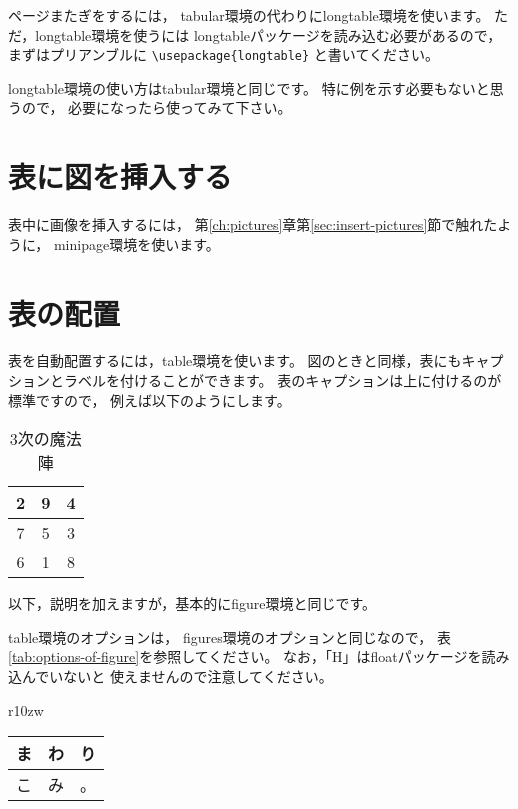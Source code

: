 \documentclass[class=jreport, crop=false, preview=false, dvipdfmx, fleqn]{standalone}
\begin{document}
ページまたぎをするには，
tabular環境の代わりにlongtable環境を使います。
ただ，longtable環境を使うには
longtableパッケージを読み込む必要があるので，
まずはプリアンブルに \verb|\usepackage{longtable}| と書いてください。

longtable環境の使い方はtabular環境と同じです。
特に例を示す必要もないと思うので，
必要になったら使ってみて下さい。



\section{表に図を挿入する}
表中に画像を挿入するには，
第\ref{ch:pictures}章第\ref{sec:insert-pictures}節で触れたように，
minipage環境を使います。



\section{表の配置}
表を自動配置するには，table環境を使います。
図のときと同様，表にもキャプションとラベルを付けることができます。
表のキャプションは上に付けるのが標準ですので，
例えば以下のようにします。

\begin{ITeX}
\begin{table}
\caption{3次の魔法陣}
\label{tab:magic-table}
\begin{center}
\begin{tabular}{|c|c|c|} \hline
2 & 9 & 4 \\ \hline
7 & 5 & 3 \\ \hline
6 & 1 & 8 \\ \hline
\end{tabular}
\end{center}
\end{table}
\end{ITeX}

以下，説明を加えますが，基本的にfigure環境と同じです。

table環境のオプションは，
figures環境のオプションと同じなので，
表\ref{tab:options-of-figure}を参照してください。
なお，「H」はfloatパッケージを読み込んでいないと
使えませんので注意してください。

\begin{wraptable}{r}{10zw}
\vspace*{-\intextsep}
\begin{tabular}{|c|c|c|} \hline
ま & わ & り \\ \hline
こ & み & 。\\ \hline
\end{tabular}
\end{wraptable}
\end{document}

